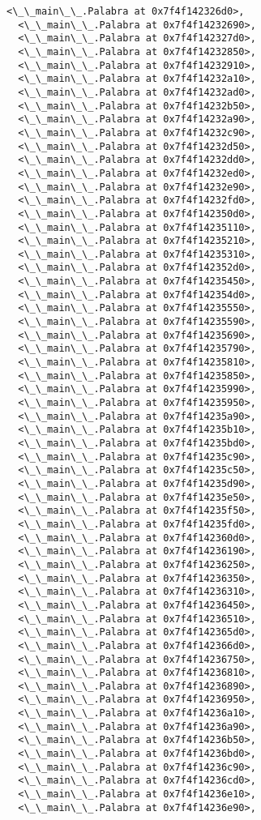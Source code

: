 \documentclass[12pt,a4paper,table]{article}
\begin{document}
\begin{tcolorbox}[breakable, size=fbox, boxrule=.5pt, pad at break*=1mm, opacityfill=0]
\begin{Verbatim}[commandchars=\\\{\}]
  <\_\_main\_\_.Palabra at 0x7f4f142326d0>,
  <\_\_main\_\_.Palabra at 0x7f4f14232690>,
  <\_\_main\_\_.Palabra at 0x7f4f142327d0>,
  <\_\_main\_\_.Palabra at 0x7f4f14232850>,
  <\_\_main\_\_.Palabra at 0x7f4f14232910>,
  <\_\_main\_\_.Palabra at 0x7f4f14232a10>,
  <\_\_main\_\_.Palabra at 0x7f4f14232ad0>,
  <\_\_main\_\_.Palabra at 0x7f4f14232b50>,
  <\_\_main\_\_.Palabra at 0x7f4f14232a90>,
  <\_\_main\_\_.Palabra at 0x7f4f14232c90>,
  <\_\_main\_\_.Palabra at 0x7f4f14232d50>,
  <\_\_main\_\_.Palabra at 0x7f4f14232dd0>,
  <\_\_main\_\_.Palabra at 0x7f4f14232ed0>,
  <\_\_main\_\_.Palabra at 0x7f4f14232e90>,
  <\_\_main\_\_.Palabra at 0x7f4f14232fd0>,
  <\_\_main\_\_.Palabra at 0x7f4f142350d0>,
  <\_\_main\_\_.Palabra at 0x7f4f14235110>,
  <\_\_main\_\_.Palabra at 0x7f4f14235210>,
  <\_\_main\_\_.Palabra at 0x7f4f14235310>,
  <\_\_main\_\_.Palabra at 0x7f4f142352d0>,
  <\_\_main\_\_.Palabra at 0x7f4f14235450>,
  <\_\_main\_\_.Palabra at 0x7f4f142354d0>,
  <\_\_main\_\_.Palabra at 0x7f4f14235550>,
  <\_\_main\_\_.Palabra at 0x7f4f14235590>,
  <\_\_main\_\_.Palabra at 0x7f4f14235690>,
  <\_\_main\_\_.Palabra at 0x7f4f14235790>,
  <\_\_main\_\_.Palabra at 0x7f4f14235810>,
  <\_\_main\_\_.Palabra at 0x7f4f14235850>,
  <\_\_main\_\_.Palabra at 0x7f4f14235990>,
  <\_\_main\_\_.Palabra at 0x7f4f14235950>,
  <\_\_main\_\_.Palabra at 0x7f4f14235a90>,
  <\_\_main\_\_.Palabra at 0x7f4f14235b10>,
  <\_\_main\_\_.Palabra at 0x7f4f14235bd0>,
  <\_\_main\_\_.Palabra at 0x7f4f14235c90>,
  <\_\_main\_\_.Palabra at 0x7f4f14235c50>,
  <\_\_main\_\_.Palabra at 0x7f4f14235d90>,
  <\_\_main\_\_.Palabra at 0x7f4f14235e50>,
  <\_\_main\_\_.Palabra at 0x7f4f14235f50>,
  <\_\_main\_\_.Palabra at 0x7f4f14235fd0>,
  <\_\_main\_\_.Palabra at 0x7f4f142360d0>,
  <\_\_main\_\_.Palabra at 0x7f4f14236190>,
  <\_\_main\_\_.Palabra at 0x7f4f14236250>,
  <\_\_main\_\_.Palabra at 0x7f4f14236350>,
  <\_\_main\_\_.Palabra at 0x7f4f14236310>,
  <\_\_main\_\_.Palabra at 0x7f4f14236450>,
  <\_\_main\_\_.Palabra at 0x7f4f14236510>,
  <\_\_main\_\_.Palabra at 0x7f4f142365d0>,
  <\_\_main\_\_.Palabra at 0x7f4f142366d0>,
  <\_\_main\_\_.Palabra at 0x7f4f14236750>,
  <\_\_main\_\_.Palabra at 0x7f4f14236810>,
  <\_\_main\_\_.Palabra at 0x7f4f14236890>,
  <\_\_main\_\_.Palabra at 0x7f4f14236950>,
  <\_\_main\_\_.Palabra at 0x7f4f14236a10>,
  <\_\_main\_\_.Palabra at 0x7f4f14236a90>,
  <\_\_main\_\_.Palabra at 0x7f4f14236b50>,
  <\_\_main\_\_.Palabra at 0x7f4f14236bd0>,
  <\_\_main\_\_.Palabra at 0x7f4f14236c90>,
  <\_\_main\_\_.Palabra at 0x7f4f14236cd0>,
  <\_\_main\_\_.Palabra at 0x7f4f14236e10>,
  <\_\_main\_\_.Palabra at 0x7f4f14236e90>,

\end{Verbatim}
\end{tcolorbox}
\end{document}

